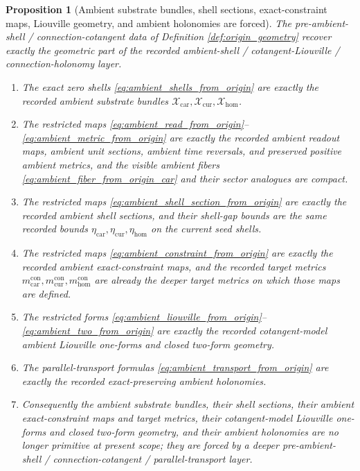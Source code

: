 \documentclass[11pt]{article}
\newcommand{\TensorConstraintMetric}{m_{\mathrm{car}}^{\mathrm{con}}}
\newcommand{\CurConstraintMetric}{m_{\mathrm{cur}}^{\mathrm{con}}}
\newcommand{\HomConstraintMetric}{m_{\mathrm{hom}}^{\mathrm{con}}}
\newcommand{\TensorAmbientSpace}{\mathcal X_{\mathrm{car}}}
\newcommand{\CurAmbientSpace}{\mathcal X_{\mathrm{cur}}}
\newcommand{\HomAmbientSpace}{\mathcal X_{\mathrm{hom}}}
\newcommand{\TensorShellGap}{\eta_{\mathrm{car}}}
\newcommand{\CurShellGap}{\eta_{\mathrm{cur}}}
\newcommand{\HomShellGap}{\eta_{\mathrm{hom}}}
\newtheorem{proposition}{Proposition}
\begin{document}
\begin{proposition}[Ambient substrate bundles, shell sections, exact-constraint maps, Liouville geometry, and ambient holonomies are forced]
\label{prop:ambient_geometry_forced}
The pre-ambient-shell / connection-cotangent data of Definition \ref{def:origin_geometry} recover exactly the geometric part of the recorded ambient-shell / cotangent-Liouville / connection-holonomy layer.
\begin{enumerate}
    \item The exact zero shells \eqref{eq:ambient_shells_from_origin} are exactly the recorded ambient substrate bundles \(\TensorAmbientSpace,\CurAmbientSpace,\HomAmbientSpace\).
    \item The restricted maps \eqref{eq:ambient_read_from_origin}--\eqref{eq:ambient_metric_from_origin} are exactly the recorded ambient readout maps, ambient unit sections, ambient time reversals, and preserved positive ambient metrics, and the visible ambient fibers \eqref{eq:ambient_fiber_from_origin_car} and their sector analogues are compact.
    \item The restricted maps \eqref{eq:ambient_shell_section_from_origin} are exactly the recorded ambient shell sections, and their shell-gap bounds are the same recorded bounds \(\TensorShellGap,\CurShellGap,\HomShellGap\) on the current seed shells.
    \item The restricted maps \eqref{eq:ambient_constraint_from_origin} are exactly the recorded ambient exact-constraint maps, and the recorded target metrics \(\TensorConstraintMetric,\CurConstraintMetric,\HomConstraintMetric\) are already the deeper target metrics on which those maps are defined.
    \item The restricted forms \eqref{eq:ambient_liouville_from_origin}--\eqref{eq:ambient_two_from_origin} are exactly the recorded cotangent-model ambient Liouville one-forms and closed two-form geometry.
    \item The parallel-transport formulas \eqref{eq:ambient_transport_from_origin} are exactly the recorded exact-preserving ambient holonomies.
    \item Consequently the ambient substrate bundles, their shell sections, their ambient exact-constraint maps and target metrics, their cotangent-model Liouville one-forms and closed two-form geometry, and their ambient holonomies are no longer primitive at present scope; they are forced by a deeper pre-ambient-shell / connection-cotangent / parallel-transport layer.
\end{enumerate}
\end{proposition}
\end{document}
